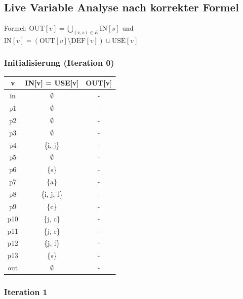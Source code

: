 \documentclass[11pt,a4paper]{article}
\begin{document}
\subsection*{Live Variable Analyse nach korrekter Formel}

Formel: $\text{OUT}[v] = \bigcup_{(v,s) \in E} \text{IN}[s]$ und $\text{IN}[v] = (\text{OUT}[v] \setminus \text{DEF}[v]) \cup \text{USE}[v]$

\subsubsection*{Initialisierung (Iteration 0)}

    \begin{longtable}{| c | c | c |}
    \hline
    v & IN[v] = USE[v] & OUT[v] \\
    \hline
    in & $\emptyset$ & - \\
    \hline
    p1 & $\emptyset$ & - \\
    \hline
    p2 & $\emptyset$ & - \\
    \hline
    p3 & $\emptyset$ & - \\
    \hline
    p4 & \{i, j\} & - \\
    \hline
    p5 & $\emptyset$ & - \\
    \hline
    p6 & \{s\} & - \\
    \hline
    p7 & \{a\} & - \\
    \hline
    p8 & \{i, j, f\} & - \\
    \hline
    p9 & \{c\} & - \\
    \hline
    p10 & \{j, c\} & - \\
    \hline
    p11 & \{j, c\} & - \\
    \hline
    p12 & \{j, f\} & - \\
    \hline
    p13 & \{s\} & - \\
    \hline
    out & $\emptyset$ & - \\
    \hline
\end{longtable}

\subsubsection*{Iteration 1}
\end{document}
